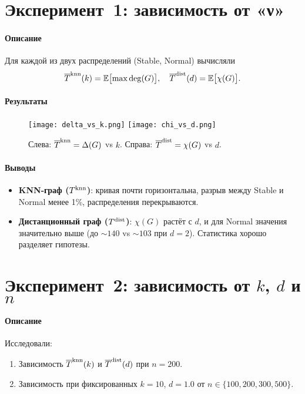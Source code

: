 \documentclass[12pt,a4paper]{article}
\begin{document}
\section{Эксперимент 1: зависимость от «ν»}
\paragraph{Описание}
Для каждой из двух распределений (Stable, Normal) вычисляли
\[
\overline{T}^{\rm knn}(k)
=\mathbb{E}\bigl[\max\deg(G)\bigr],\quad
\overline{T}^{\rm dist}(d)
=\mathbb{E}\bigl[\chi(G)\bigr].
\]

\paragraph{Результаты}
\begin{figure}[ht]
  \centering
  \texttt{[image: delta\_vs\_k.png]}
  \texttt{[image: chi\_vs\_d.png]}
  \caption{Слева: $\overline{T}^{\rm knn}=\Delta(G)$ vs $k$. 
           Справа: $\overline{T}^{\rm dist}=\chi(G)$ vs $d$.}
\end{figure}

\paragraph{Выводы}
\begin{itemize}
  \item \textbf{KNN‑граф ($T^{\rm knn}$)}: кривая почти горизонтальна, 
    разрыв между Stable и Normal менее 1\%, распределения перекрываются.
  \item \textbf{Дистанционный граф ($T^{\rm dist}$)}: $\chi(G)$ растёт с $d$, 
    и для Normal значения значительно выше (до $\sim140$ vs $\sim103$ при $d=2$). 
    Статистика хорошо разделяет гипотезы.
\end{itemize}

\section{Эксперимент 2: зависимость от $k$, $d$ и $n$}
\paragraph{Описание}
Исследовали:
\begin{enumerate}
  \item Зависимость $\overline{T}^{\rm knn}(k)$ и $\overline{T}^{\rm dist}(d)$ при $n=200$.
  \item Зависимость при фиксированных $k=10$, $d=1.0$ от $n\in\{100,200,300,500\}$.
\end{enumerate}
\end{document}
